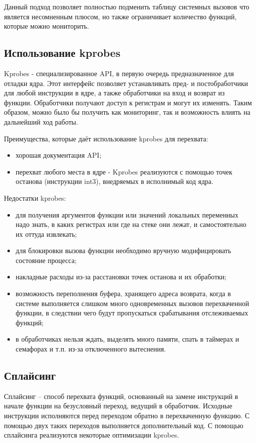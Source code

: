 Данный подход позволяет полностью подменить таблицу системных вызовов что является несомненным плюсом, но также ограничивает количество функций, которые можно мониторить.

\subsection{Использование kprobes}
Kprobes - специализированное API, в первую очередь предназначенное для отладки ядра. Этот интерфейс позволяет устанавливать пред- и постобработчики для любой инструкции в ядре, а также обработчики на вход и возврат из функции. Обработчики получают доступ к регистрам и могут их изменять. Таким образом, можно было бы получить как мониторинг, так и возможность влиять на дальнейший ход работы.

Преимущества, которые даёт использование kprobes для перехвата:
\begin{itemize}
	\item хорошая документация API;
	\item перехват любого места в ядре - Kprobes реализуются с помощью точек останова (инструкции int3), внедряемых в исполнимый код ядра.
\end{itemize}

Недостатки kprobes:

\begin{itemize}
	\item для получения аргументов функции или значений локальных переменных надо знать, в каких регистрах или где на стеке они лежат, и самостоятельно их оттуда извлекать;
	\item для блокировки вызова функции необходимо вручную модифицировать состояние процесса;
	\item накладные расходы из-за расстановки точек останова и их обработки;
	\item возможность переполнения буфера, хранящего адреса возврата, когда в системе выполняется слишком много одновременных вызовов перехваченной функции, в следствии чего будут пропускаться срабатывания отслеживаемых функций;
	\item в обработчиках нельзя ждать, выделять много памяти, спать в таймерах и семафорах и т.п. из-за отключенного вытеснения.
\end{itemize}

\subsection{Сплайсинг}
Сплайсинг – способ перехвата функций, основанный на замене инструкций в начале функции на безусловный переход, ведущий в обработчик. Исходные инструкции исполняются перед переходом обратно в
перехваченную функцию. С помощью двух таких переходов выполняется
дополнительный код. С помощью сплайсинга реализуются некоторые
оптимизации kprobes.

